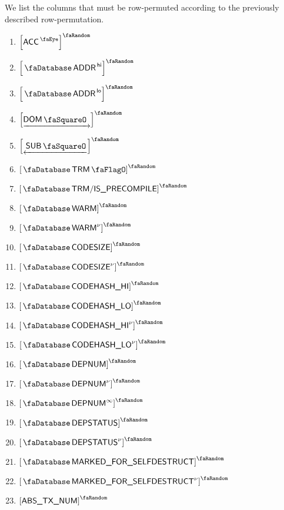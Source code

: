 We list the columns that must be row-permuted according to the previously described row-permutation.
\begin{multicols}{3}
	\begin{enumerate}
		\item $\order{\peekAccount}$
		\item $\order{\accAddress\high}$
		\item $\order{\accAddress\low}$
		\item $\order{\domStamp}$
		\item $\order{\subStamp}$
		\item $\order{\accTrmFlag}$
		\item $\order{\accTrmIsPrecompile}$
		\item $\order{\accWarmth}$
		\item $\order{\accWarmth\new}$
		\item $\order{\accCodesize}$
		\item $\order{\accCodesize\new}$
		\item $\order{\accCodehashHi}$
		\item $\order{\accCodehashLo}$
		\item $\order{\accCodehashHi\new}$
		\item $\order{\accCodehashLo\new}$
		\item $\order{\accDepNumber}$
		\item $\order{\accDepNumber\new}$
		\item $\order{\accDepNumber^\infty}$
		\item $\order{\accDepStatus}$
		\item $\order{\accDepStatus\new}$
		\item $\order{\accMarkedForSelfdestruct}$
		\item $\order{\accMarkedForSelfdestruct\new}$
		\item $\order{\absTxNum}$
	\end{enumerate}
\end{multicols}
